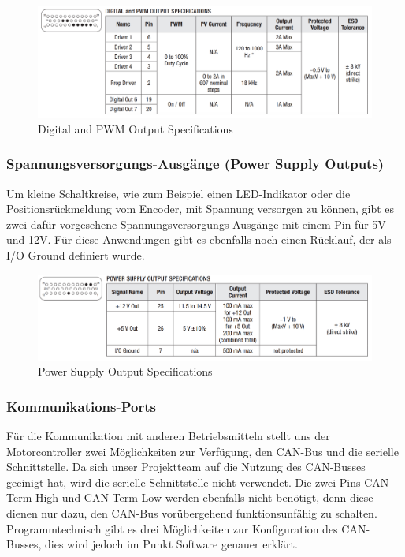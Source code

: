 \begin{figure}[H]
	\begin{center}
		\includegraphics[width=\textwidth]{figures/antrieb/Digital_PWM_Output_Specifications.png}
		\caption{Digital and PWM Output Specifications}
	\end{center}
\end{figure}



\subsubsection{Spannungsversorgungs-Ausgänge (Power Supply Outputs)}
Um kleine Schaltkreise, wie zum Beispiel einen LED-Indikator oder die Positionsrückmeldung vom Encoder, mit Spannung versorgen zu können, gibt es zwei dafür vorgesehene Spannungsversorgungs-Ausgänge mit einem Pin für 5V und 12V. Für diese Anwendungen gibt es ebenfalls noch einen Rücklauf, der als I/O Ground definiert wurde.

\begin{figure}[H]
	\begin{center}
		\includegraphics[width=\textwidth]{figures/antrieb/Power_Supply_Output_Specifications.png}
		\caption{Power Supply Output Specifications}
	\end{center}
\end{figure}


\newpage


\subsubsection{Kommunikations-Ports}
Für die Kommunikation mit anderen Betriebsmitteln stellt uns der Motorcontroller zwei Möglichkeiten zur Verfügung, den CAN-Bus und die serielle Schnittstelle. Da sich unser Projektteam auf die Nutzung des CAN-Busses geeinigt hat, wird die serielle Schnittstelle nicht verwendet. Die zwei Pins CAN Term High und CAN Term Low werden ebenfalls nicht benötigt, denn diese dienen nur dazu, den CAN-Bus vorübergehend funktionsunfähig zu schalten. Programmtechnisch gibt es drei Möglichkeiten zur Konfiguration des CAN-Busses, dies wird jedoch im Punkt Software genauer erklärt.

